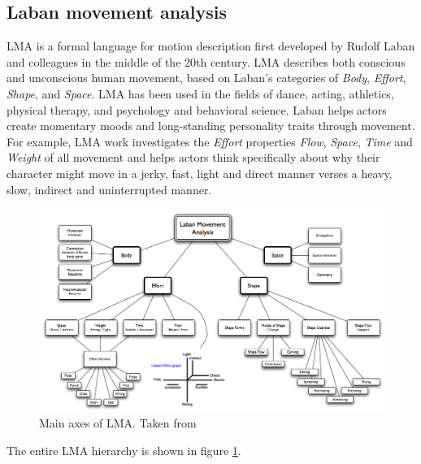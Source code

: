 \documentclass[11pt,twocolumn,varwidth=true,a4paper,fleqn]{article}
\begin{document}
\subsection{Laban movement analysis}
LMA is a formal language for motion description first developed by Rudolf Laban \cite{Laban} and colleagues in the middle of the 20th century. 
LMA describes both conscious and unconscious human movement, based on Laban's categories of \textit{Body}, \textit{Effort}, \textit{Shape}, and \textit{Space}. 
LMA has been used in the fields of dance, acting, athletics, physical therapy, and psychology and behavioral science.
Laban helps actors create momentary moods and long-standing personality traits through movement. For example, LMA work investigates the \textit{Effort} properties \textit{Flow}, \textit{Space}, \textit{Time} and \textit{Weight} of all movement and helps actors think specifically about why their character might move in a jerky, fast, light and direct manner verses a heavy, slow, indirect and uninterrupted manner.
\begin{figure}[ht]
\centering
\includegraphics[width=\textwidth]{laban.png}
\caption{Main axes of LMA. Taken from \cite{labanTree}}
\label{labanTree}
\end{figure}
The entire LMA hierarchy is shown in figure \ref{labanTree}.
\end{document}
